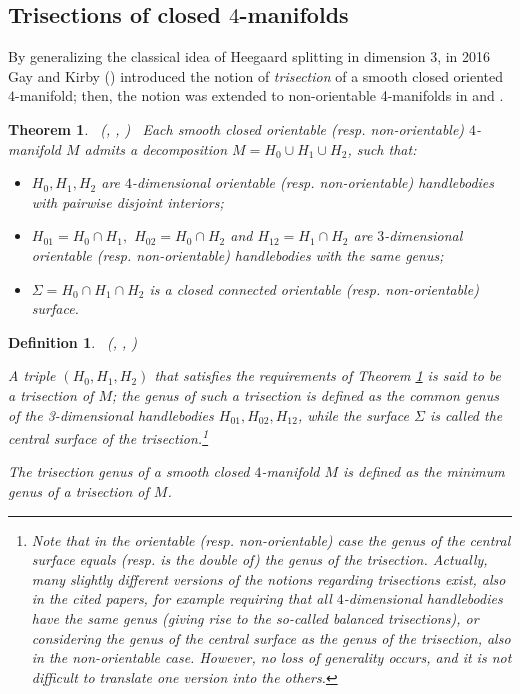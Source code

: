 \documentclass[12pt,a4paper]{article}
\newtheorem{theorem}[lemma]{Theorem}
\newtheorem{definition}{Definition}
\begin{document}
\bigskip 

\subsection{Trisections of closed $4$-manifolds}  \label{ss: trisections} 

\smallskip 

By generalizing the classical idea of Heegaard splitting in dimension 3, in 2016 Gay and Kirby (\cite{Gay-Kirby}) introduced the notion of {\it trisection} of a smooth closed oriented $4$-manifold; then, the notion was extended to non-orientable 4-manifolds in \cite{Spreer-Tillmann(Exp)} and \cite{Miller-Naylor}.

 
\begin{theorem}  \ {\rm (\cite{Gay-Kirby}, \cite{Spreer-Tillmann(Exp)}, \cite{Miller-Naylor})} \  \label{th: trisection}
Each smooth closed orientable (resp. non-orientable) $4$-manifold $M$ admits a decomposition $M = H_0 \cup H_1 \cup H_2$, such that:  
 \begin{itemize}
 \item [(a)]  $H_{0}, H_{1}, H_{2}$ are $4$-dimensional orientable (resp. non-orientable) handlebodies with pairwise disjoint interiors; 
 \item [(b)]  $H_{01}=H_{0}\cap H_{1},$  $H_{02}=H_{0}\cap H_{2}$ and $H_{12}=H_1\cap H_2$ are $3$-dimensional orientable (resp. non-orientable) handlebodies with the same genus; 
 \item [(c)]  $\Sigma = H_{0}\cap H_{1}\cap H_{2}$  is a closed connected orientable (resp. non-orientable) surface. 
 \end{itemize}
\end{theorem} 

\begin{definition} \ {\rm (\cite{Gay-Kirby}, \cite{Spreer-Tillmann(Exp)}, \cite{Miller-Naylor})} \  \label{def: trisection}
{\em A triple $(H_0, H_1, H_2)$ that satisfies the requirements of Theorem \ref{th: trisection} is said to be a {\it trisection} of $M$; the {\it genus} of such a trisection is defined as the common genus of the 3-dimensional handlebodies $H_{01}, H_{02}, H_{12}$, while the surface $\Sigma$ is called the {\it central surface} of the trisection.\footnote{Note that in the orientable (resp. non-orientable) case the genus of the central surface equals (resp. is the double of) the genus of the trisection.  Actually, many slightly different versions of the notions regarding trisections exist, also in the cited %
papers, for example requiring that all $4$-dimensional handlebodies have the same genus (giving rise to the so-called {\it balanced trisections}), or considering the genus of the central surface as the genus of the trisection, also in the non-orientable case. However, no loss of generality occurs, and it is not difficult to translate one version into the others.} 

The {\it trisection genus} of a smooth closed $4$-manifold $M$ is defined as the minimum genus of a trisection of $M$.  }
\end{definition}  
\end{document}
